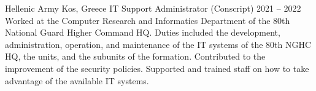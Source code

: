 
\begin{cventries}
    \cventryiv
        {Hellenic Army}
        {Kos, Greece}
        {IT Support Administrator (Conscript)}
        {2021 -- 2022}
    \cventryi
        {Worked at the Computer Research and Informatics Department of the 80th National Guard Higher Command HQ. Duties included the development, administration, operation, and maintenance of the IT systems of the 80th NGHC HQ, the units, and the subunits of the formation. Contributed to the improvement of the security policies. Supported and trained staff on how to take advantage of the available IT systems.}
\end{cventries}
